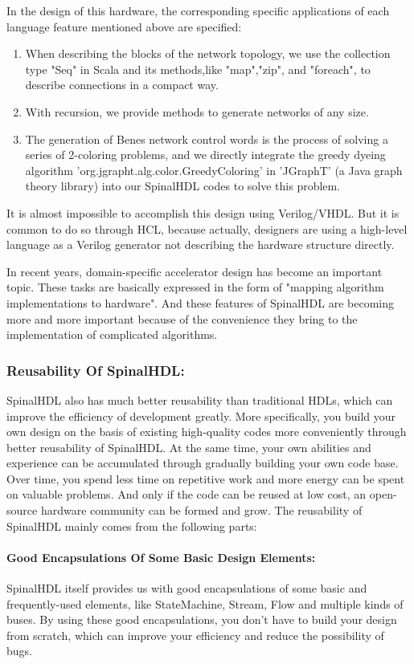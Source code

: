 \documentclass{article}
\begin{document}
In the design of this hardware, the corresponding specific applications of each language feature mentioned above are specified:
\begin{enumerate}
    \item When describing the blocks of the network topology, we use the collection type "Seq" in Scala and its methods,like "map","zip", and "foreach", to describe connections in a compact way.
    \item With recursion, we provide methods to generate networks of any size.
    \item The generation of Benes network control words is the process of solving a series of 2-coloring problems, and we directly integrate the greedy dyeing algorithm 'org.jgrapht.alg.color.GreedyColoring' in 'JGraphT' (a Java graph theory library) into our SpinalHDL codes to solve this problem.
\end{enumerate}

It is almost impossible to accomplish this design using Verilog/VHDL. But it is common to do so through HCL, because actually, designers are using a high-level language as a Verilog generator not describing the hardware structure directly.

In recent years, domain-specific accelerator design has become an important topic. These tasks are basically expressed in the form of "mapping algorithm implementations to hardware". And these features of SpinalHDL are becoming more and more important because of the convenience they bring to the implementation of complicated algorithms.



\subsubsection{Reusability Of SpinalHDL:}
SpinalHDL also has much better reusability than traditional HDLs, which can improve the efficiency of development greatly. More specifically, you build your own design on the basis of existing high-quality codes more conveniently through better reusability of SpinalHDL. At the same time, your own abilities and experience can be accumulated through gradually building your own code base. Over time, you spend less time on repetitive work and more energy can be spent on valuable problems. And only if the code can be reused at low cost, an open-source hardware community can be formed and grow. The reusability of SpinalHDL mainly comes from the following parts:


\paragraph{\textbf{Good Encapsulations Of Some Basic Design} Elements:}
SpinalHDL itself provides us with good encapsulations of some basic and frequently-used elements, like StateMachine, Stream, Flow and multiple kinds of buses. By using these good encapsulations, you don’t have to build your design from scratch, which can improve your efficiency and reduce the possibility of bugs. 
\end{document}
